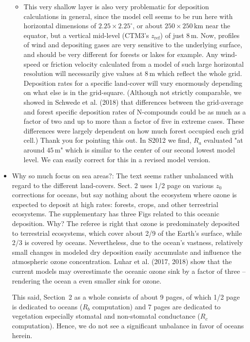 \documentclass{scrartcl}
\begin{document}
\begin{itemize}
\begin{itemize}
\item {\color{blue} This very shallow layer is also very problematic for deposition calculations in general,
since the model cell seems to be run here with horizontal dimensions of $2.25 \times 2.25^\circ$,
or about $250 \times 250\,\mathrm{km}$ near the equator, but a vertical mid-level (CTM3’s $z_\mathrm{ref}$) of
just 8\,m. Now, profiles of wind and depositing gases are very sensitive to the underlying
surface, and should be very different for forests or lakes for example. Any wind-speed
or friction velocity calculated from a model of such large horizontal resolution will necessarily give values
at 8\,m which reflect the whole grid. Deposition rates for a specific
land-cover will vary enormously depending on what else is in the grid-square. (Although not strictly comparable,
we showed in Schwede et al. (2018) that differences
between the grid-average and forest specific deposition rates of N-compounds could be
as much as a factor of two and up to more than a factor of five in extreme cases. These
differences were largely dependent on how much forest occupied each grid cell.)}
  Thank you for pointing this out. In S2012 we find, $R_a$ evaluated "at around $45\,\mathrm{m}$" which is similar to the center of our second lowest model level. We can easily correct for this in a revised model version. 
  \end{itemize}
  
\item {\color{blue} Why so much focus on sea areas?: The text seems rather unbalanced with regard to the different land-covers. Sect. 2 uses 1/2 page on various $z_0$ corrections for oceans, but say nothing about the ecosystem
where ozone is expected to deposit at high rates: forests, crops, and other terrestrial
ecosystems. The supplementary has three Figs related to this oceanic deposition. Why?}
  The referee is right that ozone is predominately deposited to terrestrial ecosystems, which cover about 2/9 of the Earth's surface, while 2/3 is covered by oceans. Nevertheless, due to the ocean's vastness, relatively small changes in modeled dry deposition easily accumulate and influence the atmospheric ozone concentration. Luhar et al. (2017, 2018) show that the current models may overestimate the oceanic ozone sink by a factor of three -- rendering the ocean a even smaller sink for ozone.
  
  This said, Section~2 as a whole consists of about 9 pages, of which 1/2 page is dedicated to oceans ($R_b$ computation) and 7 pages are dedicated to vegetation especially stomatal and non-stomatal conductance ($R_c$ computation). Hence, we do not see a significant unbalance in favor of oceans herein.


\end{itemize}
\end{document}
